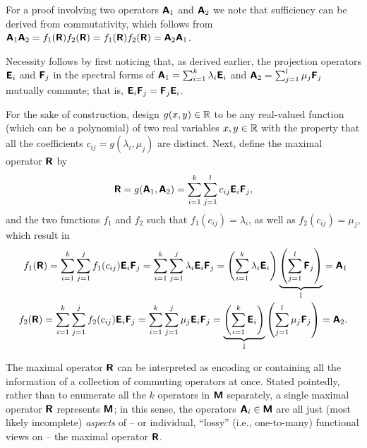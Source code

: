 {\color{OliveGreen}\bproof
For a proof involving two operators $\textsf{\textbf{A}}_1$ and $\textsf{\textbf{A}}_2$ we note that
sufficiency  can be derived from   commutativity, which follows from
$
\textsf{\textbf{A}}_1\textsf{\textbf{A}}_2=f_1 (\textsf{\textbf{R}}) f_2 (\textsf{\textbf{R}}) =
f_1 (\textsf{\textbf{R}}) f_2 (\textsf{\textbf{R}})= \textsf{\textbf{A}}_2\textsf{\textbf{A}}_1
$.

Necessity follows by first noticing that, as derived earlier, the projection operators
$\textsf{\textbf{E}}_i$ and $\textsf{\textbf{F}}_j$
in the spectral forms of $\textsf{\textbf{A}}_1=\sum_{i=1}^k \lambda_i\textsf{\textbf{E}}_i$
and
$\textsf{\textbf{A}}_2=\sum_{j=1}^l \mu_j\textsf{\textbf{F}}_j$ mutually commute; that is,
$
\textsf{\textbf{E}}_i \textsf{\textbf{F}}_j
=
\textsf{\textbf{F}}_j \textsf{\textbf{E}}_i
$.

For the sake of construction, design $g(x,y)\in {\Bbb R}$ to be any real-valued function (which can be a polynomial) of two real variables $x,y \in {\Bbb R}$ with the property
that all the coefficients  $c_{ij} = g( \lambda_i,\mu_j )$ are distinct.
Next, define  the maximal operator $\textsf{\textbf{R}}$ by
\begin{equation}
\textsf{\textbf{R}} = g(\textsf{\textbf{A}}_1, \textsf{\textbf{A}}_2) =  \sum_{i=1}^k \sum_{j=1}^l c_{ij}  \textsf{\textbf{E}}_i\textsf{\textbf{F}}_j,
\end{equation}
and the two functions $f_1$ and $f_2$ such that
$f_1(c_{ij}) = \lambda_i$, as well as
$f_2(c_{ij}) = \mu_j$, which result in
\begin{equation}
\begin{split}
f_1(\textsf{\textbf{R}}) = \sum_{i=1}^k \sum_{j=1}^j f_1(c_{ij})  \textsf{\textbf{E}}_i\textsf{\textbf{F}}_j = \sum_{i=1}^k \sum_{j=1}^j \lambda_i  \textsf{\textbf{E}}_i\textsf{\textbf{F}}_j
= \left( \sum_{i=1}^k \lambda_i \textsf{\textbf{E}}_i\right) \underbrace{\left(\sum_{j=1}^l \textsf{\textbf{F}}_j\right)}_{\Bbb I} = \textsf{\textbf{A}}_1
\\
f_2(\textsf{\textbf{R}}) = \sum_{i=1}^k \sum_{j=1}^j f_2(c_{ij})  \textsf{\textbf{E}}_i\textsf{\textbf{F}}_j = \sum_{i=1}^k \sum_{j=1}^j \mu_j  \textsf{\textbf{E}}_i\textsf{\textbf{F}}_j
= \underbrace{\left(\sum_{i=1}^k \textsf{\textbf{E}}_i\right)}_{\Bbb I}\left( \sum_{j=1}^l \mu_j \textsf{\textbf{F}}_j\right)  = \textsf{\textbf{A}}_2
.
\end{split}
\end{equation}
\eproof
}

The  maximal operator $\textsf{\textbf{R}}$ can be interpreted as
encoding or containing all the information of a collection of commuting operators at once.
Stated pointedly, rather than to enumerate all the $k$ operators in $\textsf{\textbf{M}}$
separately,
a single maximal operator  $\textsf{\textbf{R}}$  represents  $\textsf{\textbf{M}}$;
in this sense, the operators  $\textsf{\textbf{A}}_i \in \textsf{\textbf{M}}$
are all just (most likely incomplete) {\em aspects}  of --
or individual, ``lossy'' (i.e., one-to-many) functional views on -- the  maximal operator $\textsf{\textbf{R}}$.

